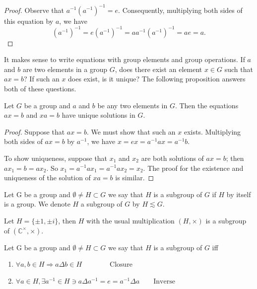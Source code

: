 \begin{proof}
Observe that $a^{-1} (a^{-1})^{-1} = e$. Consequently, multiplying
both sides of this equation by $a$, we have
$$ (a^{-1})^{-1} = e (a^{-1})^{-1} = a a^{-1} (a^{-1})^{-1} = ae = a.$$
\end{proof}
It makes sense to write equations with group elements and group operations. If $a$ and $b$ are two elements in a group $G$, does there exist an element $x \in G$ such that $ax = b$? If such an $x$ does exist, is it unique? The following proposition answers both of these questions.


\begin{proposition}\label{group_equations}
Let $G$ be a group and $a$ and $b$ be any two elements in $G$. Then the equations $ax = b$ and $xa = b$ have unique solutions in $G$.
\end{proposition}


\begin{proof}
Suppose that $ax = b$. We must show that such an $x$ exists. Multiplying both sides of $ax = b$ by $a^{-1}$, we have $x = ex = a^{-1}ax = a^{-1}b$.


To show uniqueness, suppose that $x_1$ and $x_2$ are both solutions of $ax = b$; then $ax_1 = b = ax_2$. So $x_1 = a^{-1}ax_1 = a^{-1}ax_2 = x_2$. The proof for the existence and uniqueness of the solution of $xa = b$ is similar.
\end{proof}

\begin{definition}
Let G be a group and $\emptyset \neq H\subset G$ we say that $H$ is a subgroup of $G$ if $H$ by itself is a group.
We denote $H$ a subgroup of $G$ by $H\lesssim G$.
\end{definition}

\begin{example}
Let $H=\{ \pm1,\pm i\}$, then $H$ with the usual multiplication $(H,\times)$ is a subgroup of $(\mathbb{C^{\times}},\times)$.
\end{example}
\begin{proposition}\label{subtest}
Let G be a group and $\emptyset \neq H\subset G$ we say that $H$ is a subgroup of $G$ iff
\begin{enumerate}
  \item $\forall a,b\in H \Rightarrow a\Delta b \in H \qquad \qquad \text{Closure}$
  \item $\forall a \in H,\exists a^{-1}\in H \ni a\Delta a^{-1} =e=a^{-1}\Delta a \qquad \text{Inverse}$
\end{enumerate}
\end{proposition}

